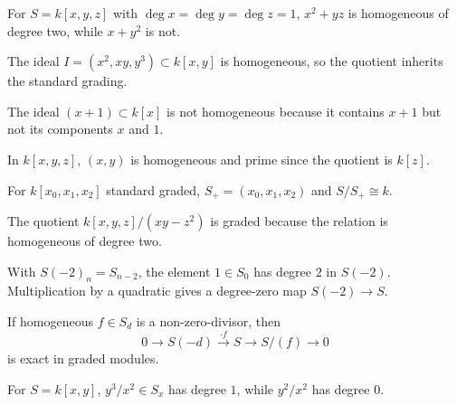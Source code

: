 \begin{example}\label{ex:vi34-01}
For \(S=k[x,y,z]\) with \(\deg x=\deg y=\deg z=1\), \(x^2+yz\) is homogeneous of degree two, while \(x+y^2\) is not.
\end{example}

\begin{example}\label{ex:vi34-02}
The ideal \(I=(x^2,xy,y^3)\subset k[x,y]\) is homogeneous, so the quotient inherits the standard grading.
\end{example}

\begin{example}\label{ex:vi34-03}
The ideal \((x+1)\subset k[x]\) is not homogeneous because it contains \(x+1\) but not its components \(x\) and \(1\).
\end{example}

\begin{example}\label{ex:vi34-04}
In \(k[x,y,z]\), \((x,y)\) is homogeneous and prime since the quotient is \(k[z]\).
\end{example}

\begin{example}\label{ex:vi34-05}
For \(k[x_0,x_1,x_2]\) standard graded, \(S_+=(x_0,x_1,x_2)\) and \(S/S_+\cong k\).
\end{example}

\begin{example}\label{ex:vi34-06}
The quotient \(k[x,y,z]/(xy-z^2)\) is graded because the relation is homogeneous of degree two.
\end{example}

\begin{example}\label{ex:vi34-07}
With \(S(-2)_n=S_{n-2}\), the element \(1\in S_0\) has degree \(2\) in \(S(-2)\). Multiplication by a quadratic gives a degree-zero map \(S(-2)\to S\).
\end{example}

\begin{example}\label{ex:vi34-08}
If homogeneous \(f\in S_d\) is a non-zero-divisor, then
\[
0\to S(-d)\xrightarrow{\cdot f}S\to S/(f)\to0
\]
is exact in graded modules.
\end{example}

\begin{example}\label{ex:vi34-09}
For \(S=k[x,y]\), \(y^3/x^2\in S_x\) has degree \(1\), while \(y^2/x^2\) has degree \(0\).
\end{example}

